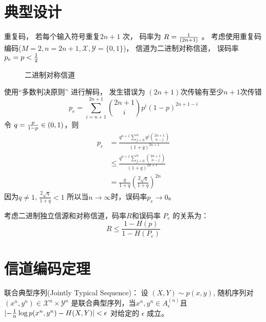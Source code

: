 \documentclass{article}
\DeclarePairedDelimiter\abs{\lvert}{\rvert}
\def\X{\mathcal{X}}
\def\Y{\mathcal{Y}}
\begin{document}
\section{典型设计}
重复码， 若每个输入符号重复$2n+1$ 次， 码率为 $R = {1 \over (2n+1)}$ 。
考虑使用重复码编码($M=2, n=2n+1, \X, \Y = \{0,1\}$)， 信道为二进制对称信道， 误码率$ p_e = p
<{1 \over 2}$
\begin{figure}[!ht]
\begin{center}
\end{center}
\caption{二进制对称信道}\label{fig:binary_symmetric_channel}%
\end{figure}
使用“多数判决原则” 进行解码， 发生错误为 $(2n+1)$次传输有至少$n+1$次传错
$$p_e = \sum_{i = n+1}^{2n+1} \binom{2n+1}{i} p^i (1-p)^{2n+1-i}  $$
令 $ q = { p \over 1-p}\in (0,1)$，则
\begin{align*}
p_e & = \frac{q^{n+1} \sum_{j=0}^n q^j \binom{2n+1}{n-j}}{(1+q)^{2n+1}} \\
& \leq  \frac{q^{n+1} \sum_{j=0}^n  \binom{2n+1}{n-j}}{(1+q)^{2n+1}} \\
&  =  \frac{q}{1+q} \left(\frac{2\sqrt{q}}{1+q} \right)^{2n}
\end{align*}
因为$q\neq 1$, $\frac{2\sqrt{q}}{1+q}<1$ 所以当$n\to \infty$时，误码率$p_e \to 0$。

考虑二进制独立信源和对称信道，码率$R$和误码率 $P_e$ 的关系为：
$$
R \leq \frac{1-H(p)} {1-H(P_e)}
$$
\section{信道编码定理}
联合典型序列(Jointly Typical Sequence)：
设 $(X, Y) \sim p(x,y)$, 随机序列对$(x^n, y^n) \in \X^n \times \Y^n $
是联合典型序列，当$x^n, y^n \in A^{(n)}_{\epsilon}$且 $\abs{-{1\over n} \log p(x^n, y^n) - H(X,Y)} <\epsilon$ 对给定的
$\epsilon$ 成立。
\end{document}
